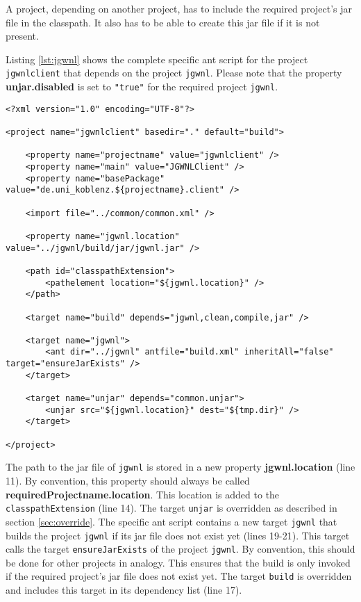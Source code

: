\documentclass[a4paper,twoside,11pt,bibtotoc]{article}
\begin{document}
A project, depending on another project, has to include the required project's jar file in the classpath.
It also has to be able to create this jar file if it is not present.

Listing \ref{lst:jgwnl} shows the complete specific ant script for the project \texttt{jgwnlclient} that depends on the project \texttt{jgwnl}.
Please note that the property \textbf{unjar.disabled} is set to \texttt{"true"} for the required project \texttt{jgwnl}.

\begin{lstlisting}[caption=specific ant script of the project \texttt{jgwnlclient},label=lst:jgwnl,float=!ht,language=ant]
<?xml version="1.0" encoding="UTF-8"?>

<project name="jgwnlclient" basedir="." default="build">

	<property name="projectname" value="jgwnlclient" />
	<property name="main" value="JGWNLClient" />
	<property name="basePackage" value="de.uni_koblenz.${projectname}.client" />

	<import file="../common/common.xml" />

	<property name="jgwnl.location" value="../jgwnl/build/jar/jgwnl.jar" />

	<path id="classpathExtension">
		<pathelement location="${jgwnl.location}" />
	</path>

	<target name="build" depends="jgwnl,clean,compile,jar" />

	<target name="jgwnl">
		<ant dir="../jgwnl" antfile="build.xml" inheritAll="false" target="ensureJarExists" />
	</target>

	<target name="unjar" depends="common.unjar">
		<unjar src="${jgwnl.location}" dest="${tmp.dir}" />
	</target>

</project>
\end{lstlisting}

The path to the jar file of \texttt{jgwnl} is stored in a new property \textbf{jgwnl.location} (line 11).
By convention, this property should always be called \textbf{requiredProjectname.location}.
This location is added to the \texttt{classpathExtension} (line 14).
The target \texttt{unjar} is overridden as described in section \ref{sec:override}.
The specific ant script contains a new target \texttt{jgwnl} that builds the project \texttt{jgwnl} if its jar file does not exist yet (lines 19-21).
This target calls the target \texttt{ensureJarExists} of the project \texttt{jgwnl}.
By convention, this should be done for other projects in analogy.
This ensures that the build is only invoked if the required project's jar file does not exist yet.
The target \texttt{build} is overridden and includes this target in its dependency list (line 17).
\end{document}
